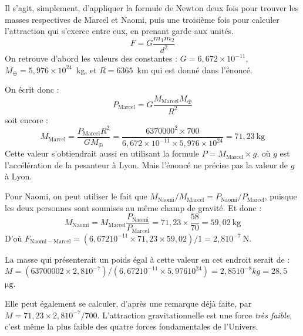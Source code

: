 \documentclass[a4paper,10pt]{report}
\newcounter{noexo}
\newenvironment{Exercise}[1][]{%
  \refstepcounter{noexo}
  \medskip\noindent\textbf{Exercice~\thenoexo~:~#1}
  \medskip\par
  \addcontentsline{toc}{paragraph}{Exercice~\thenoexo~:~#1}
  \label{exo:\thenoexo}
}{}
\renewcommand{\u}[1]{\ensuremath{\mathrm{#1}}} %
\begin{document}
\begin{Answer}
  Il s'agit, simplement, d'appliquer la formule de Newton deux fois
  pour trouver les masses respectives de Marcel et Naomi, puis une
  troisième fois pour calculer l'attraction qui s'exerce entre eux, en
  prenant garde aux unités.
  $$
  F = G \frac{m_1 m_2}{d^2}
  $$
  On retrouve d'abord les valeurs des constantes : $G = 6,672 \times
  10^{-11}$, $M_{\oplus} = 5,976 \times 10^{24}$~kg, et $R = 6365$~km
  qui est donné dans l'énoncé.

  On écrit donc :
  $$
  P_{\mathrm{Marcel}} = G \frac{M_{\mathrm{Marcel}}M_{\oplus}}{R^2}
  $$
  soit encore :
  $$
  M_{\mathrm{Marcel}} = \frac{P_{\mathrm{Marcel}}R^2}{G M_{\oplus}}
  = \frac{ 6370000^2 \times 700 }{ 6,672 \times
    10^{-11} \times 5,976 \times 10^{24} } = 71,23~\u{kg}
  $$
  Cette valeur s'obtiendrait aussi en utilisant la formule $P =
  M_{\mathrm{Marcel}}\times g$, où $g$ est l'accélération de la
  pesanteur à Lyon. Mais l'énoncé ne précise pas la valeur de $g$ à
  Lyon.

  Pour Naomi, on peut utiliser le fait que
  $M_{\mathrm{Naomi}}/M_{\mathrm{Marcel}} =
  P_{\mathrm{Naomi}}/P_{\mathrm{Marcel}}$, puisque les deux personnes
  sont soumises au même champ de gravité. Et donc :
  $$
  M_{\mathrm{Naomi}} = M_{\mathrm{Marcel}}
  \frac{P_{\mathrm{Naomi}}}{P_{\mathrm{Marcel}}} = 71,23 \times
  \frac{58}{70} = 59,02~\u{kg}
  $$
  D'où $F_{\mathrm{Naomi}-\mathrm{Marcel}} = ( 6,672 10^{-11} \times
  71,23 \times 59,02 ) / 1 = 2,8 10^{-7}~\u{N}$.

  La masse qui présenterait un poids égal à cette valeur en cet
  endroit serait de : $M = ( 63700002 \times 2,8 10^{-7} ) / ( 6,672
  10^{-11} \times 5,976 10^{24} ) = 2,85 10^{-8} kg = 28,5~$~\u{\mu
    g}.

  Elle peut également se calculer, d'après une remarque déjà faite,
  par $M = 71,23 \times 2,8 10^{-7} / 700$. L'attraction
  gravitationnelle est une force \emph{très faible}, c'est même la
  plus faible des quatre forces fondamentales de l'Univers.
\end{Answer}


\end{document}
